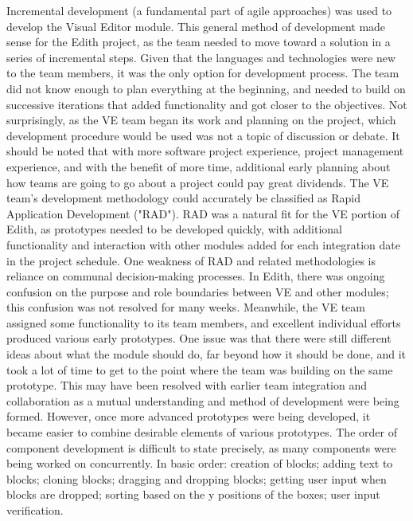 \documentclass[a4paper]{article}
\begin{document}
Incremental development (a fundamental part of agile approaches) was used to develop the Visual Editor module.  This general method of development made sense for the Edith project, as the team needed to move toward a solution in a series of incremental steps.  Given that the languages and technologies were new to the team members, it was the only option for development process.  The team did not know enough to plan everything at the beginning, and needed to build on successive iterations that added functionality and got closer to the objectives.  Not surprisingly, as the VE team began its work and planning on the project, which development procedure would be used was not a topic of discussion or debate.  It should be noted that with more software project experience, project management experience, and with the benefit of more time, additional early planning about how teams are going to go about a project could pay great dividends.    \newline  \newline 
The VE team's development methodology could accurately be classified as Rapid Application Development ("RAD").  RAD was a natural fit for the VE portion of Edith, as prototypes needed to be developed quickly, with additional functionality and interaction with other modules added for each integration date in the project schedule.  One weakness of RAD and related methodologies is reliance on communal decision-making processes.  In Edith, there was ongoing confusion on the purpose and role boundaries between VE and other modules; this confusion was not resolved for many weeks.  Meanwhile, the VE team assigned some functionality to its team members, and excellent individual efforts produced various early prototypes.  One issue was that there were still different ideas about what the module should do, far beyond how it should be done, and it took a lot of time to get to the point where the team was building on the same prototype.  This may have been resolved with earlier team integration and collaboration as a mutual understanding and method of development were being formed.  However, once more advanced prototypes were being developed, it became easier to combine desirable elements of various prototypes. \newline  \newline 
The order of component development is difficult to state precisely, as many components were being worked on concurrently.  In basic order: creation of blocks; adding text to blocks; cloning blocks; dragging and dropping blocks; getting user input when blocks are dropped; sorting based on the y positions of the boxes; user input verification. \newline  \newline 
\end{document}
